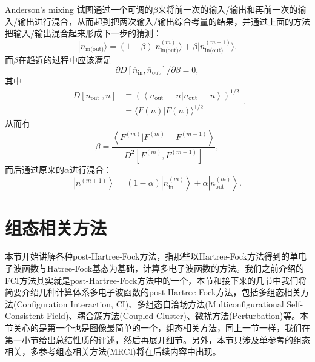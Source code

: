 \documentclass[12pt,a4paper,openany,twoside]{book}
\numberwithin{equation}{section}
\begin{document}
            Anderson's mixing 试图通过一个可调的$\beta$来将前一次的输入/输出和再前一次的输入/输出进行混合，从而起到把两次输入/输出综合考量的结果，并通过上面的方法把输入/输出混合起来形成下一步的猜测：
            \begin{equation}
                |\bar{n}_\text{in(out)} \rangle = (1-\beta) |n_\text{in(out)}^{(m)} \rangle + \beta |n_\text{in(out)}^{(m-1)} \rangle.
            \end{equation}
            而$\beta$在趋近的过程中应该满足
            \begin{equation}
                \partial D\left[\overline{n}_{\mathrm{in}}, \overline{n}_{\mathrm{out}}\right] / \partial \beta=0,
            \end{equation}
            其中
            \begin{equation}
            \begin{aligned} D\left[n_{\text {out }}, n\right] & \equiv\left(\left\langle n_{\text {out }}-n | n_{\text {out }}-n\right\rangle\right)^{1 / 2} \\ &=\langle F(n) | F(n)\rangle^{1 / 2} \end{aligned}.
            \end{equation}
            从而有
            \begin{equation}
                \beta=\frac{\left\langle F^{(m)} | F^{(m)}-F^{(m-1)}\right\rangle}{D^{2}\left[F^{(m)}, F^{(m-1)}\right]},
            \end{equation}
            而后通过原来的$\alpha$进行混合：
            \begin{equation}
                \left|n^{(m+1)}\right\rangle=(1-\alpha)\left|\overline{n}_{\text {in }}^{(m)}\right\rangle+\alpha\left|\overline{n}_{\text {out }}^{(m)}\right\rangle.
            \end{equation}

      \section{组态相关方法}
        本节开始讲解各种post-Hartree-Fock方法，指那些以Hartree-Fock方法得到的单电子波函数与Hatree-Fock基态为基础，计算多电子波函数的方法。我们之前介绍的FCI方法其实就是post-Hartree-Fock方法中的一个，本节和接下来的几节中我们将简要介绍几种计算体系多电子波函数的post-Hartree-Fock方法，包括多组态相关方法(Configuration Interaction, CI)、多组态自洽场方法(Multiconfigurational Self-Consistent-Field)、耦合簇方法(Coupled Cluster)、微扰方法(Perturbation)等。本节关心的是第一个也是图像最简单的一个，组态相关方法，同上一节一样，我们在第一小节给出总结性质的评述，然后再展开细节。另外，本节只涉及单参考的组态相关，多参考组态相关方法(MRCI)将在后续内容中出现。
        
\end{document}
